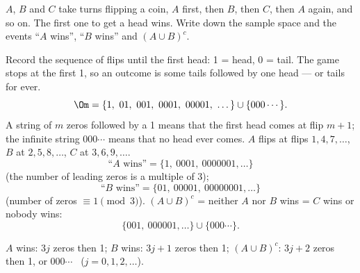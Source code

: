 
\begin{problem}
	$A$, $B$ and $C$ take turns flipping a coin, $A$ first, then $B$, then $C$,
	then $A$ again, and so on. The first one to get a head wins. Write down the
	sample space and the events ``$A$ wins'', ``$B$ wins'' and $(A\cup B)^c$.
\end{problem}

\begin{solution}
	\idea Record the sequence of flips until the first head: 1 = head, 0 =
	tail. The game stops at the first 1, so an outcome is some tails followed by
	one head --- or tails for ever.
	\[ \Om=\{1,\ 01,\ 001,\ 0001,\ 00001,\ \dots\}\cup\{000\cdots\}. \]
	A string of $m$ zeros followed by a 1 means that the first head comes at flip
	$m+1$; the infinite string $000\cdots$ means that no head ever comes.
	 $A$ flips at flips $1,4,7,\dots$, $B$ at
	$2,5,8,\dots$, $C$ at $3,6,9,\dots$.
	\[ \text{“$A$ wins”}=\{1,\ 0001,\ 0000001,\dots\} \]
	(the number of leading zeros is a multiple of 3);
	\[ \text{“$B$ wins”}=\{01,\ 00001,\ 00000001,\dots\} \]
	(number of zeros $\equiv1\pmod 3$).
	$(A\cup B)^c$ = neither $A$ nor $B$ wins = $C$ wins or nobody wins:
	\[ \{001,\ 000001,\dots\}\cup\{000\cdots\}. \]
	\begin{answer}
		$A$ wins: $3j$ zeros then 1; $B$ wins: $3j+1$ zeros then 1;
		$(A\cup B)^c$: $3j+2$ zeros then 1, or $000\cdots$ \ ($j=0,1,2,\dots$).
	\end{answer}
\end{solution}
